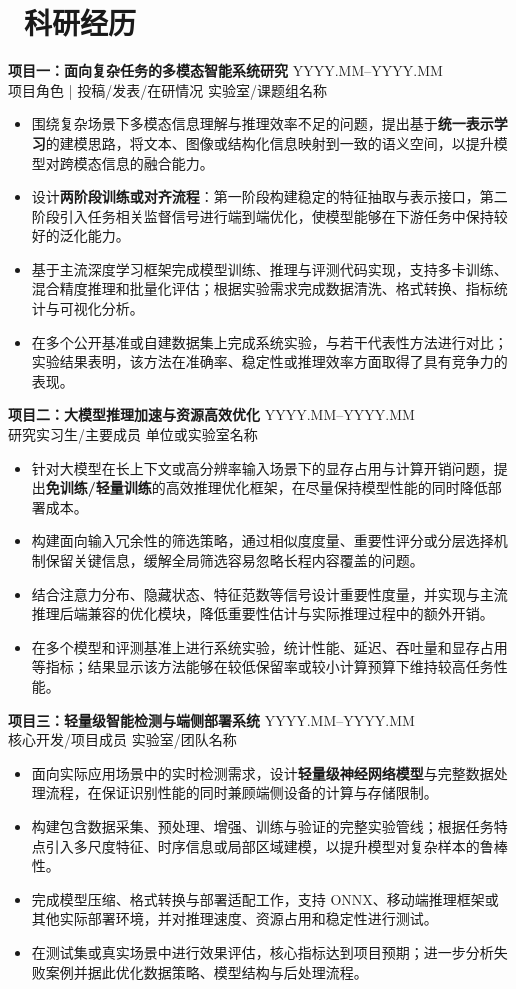 \documentclass[10pt,a4paper]{ctexart}
\newcommand{\resumeItem}[1]{\item #1}
\newcommand{\projectHeader}[4]{%
  \noindent\textcolor{iconblue}{\textbf{#1}} \hfill \textcolor{iconblue}{\small #2}\\[-0.2ex]
  {\small \textcolor{textgray}{#3 \hfill #4}}\vspace{0.2ex}
}
\begin{document}
\section*{\faCode\ 科研经历}
\projectHeader{项目一：面向复杂任务的多模态智能系统研究}{YYYY.MM--YYYY.MM}{项目角色 | 投稿/发表/在研情况}{实验室/课题组名称}
\begin{itemize}
    \resumeItem{围绕复杂场景下多模态信息理解与推理效率不足的问题，提出基于\textbf{统一表示学习}的建模思路，将文本、图像或结构化信息映射到一致的语义空间，以提升模型对跨模态信息的融合能力。}
    \resumeItem{设计\textbf{两阶段训练或对齐流程}：第一阶段构建稳定的特征抽取与表示接口，第二阶段引入任务相关监督信号进行端到端优化，使模型能够在下游任务中保持较好的泛化能力。}
    \resumeItem{基于主流深度学习框架完成模型训练、推理与评测代码实现，支持多卡训练、混合精度推理和批量化评估；根据实验需求完成数据清洗、格式转换、指标统计与可视化分析。}
    \resumeItem{在多个公开基准或自建数据集上完成系统实验，与若干代表性方法进行对比；实验结果表明，该方法在准确率、稳定性或推理效率方面取得了具有竞争力的表现。}
\end{itemize}

\vspace{0.5ex}
\projectHeader{项目二：大模型推理加速与资源高效优化}{YYYY.MM--YYYY.MM}{研究实习生/主要成员}{单位或实验室名称}
\begin{itemize}
    \resumeItem{针对大模型在长上下文或高分辨率输入场景下的显存占用与计算开销问题，提出\textbf{免训练/轻量训练}的高效推理优化框架，在尽量保持模型性能的同时降低部署成本。}
    \resumeItem{构建面向输入冗余性的筛选策略，通过相似度度量、重要性评分或分层选择机制保留关键信息，缓解全局筛选容易忽略长程内容覆盖的问题。}
    \resumeItem{结合注意力分布、隐藏状态、特征范数等信号设计重要性度量，并实现与主流推理后端兼容的优化模块，降低重要性估计与实际推理过程中的额外开销。}
    \resumeItem{在多个模型和评测基准上进行系统实验，统计性能、延迟、吞吐量和显存占用等指标；结果显示该方法能够在较低保留率或较小计算预算下维持较高任务性能。}
\end{itemize}

\vspace{0.5ex}
\projectHeader{项目三：轻量级智能检测与端侧部署系统}{YYYY.MM--YYYY.MM}{核心开发/项目成员}{实验室/团队名称}
\begin{itemize}
    \resumeItem{面向实际应用场景中的实时检测需求，设计\textbf{轻量级神经网络模型}与完整数据处理流程，在保证识别性能的同时兼顾端侧设备的计算与存储限制。}
    \resumeItem{构建包含数据采集、预处理、增强、训练与验证的完整实验管线；根据任务特点引入多尺度特征、时序信息或局部区域建模，以提升模型对复杂样本的鲁棒性。}
    \resumeItem{完成模型压缩、格式转换与部署适配工作，支持 ONNX、移动端推理框架或其他实际部署环境，并对推理速度、资源占用和稳定性进行测试。}
    \resumeItem{在测试集或真实场景中进行效果评估，核心指标达到项目预期；进一步分析失败案例并据此优化数据策略、模型结构与后处理流程。}
\end{itemize}
\end{document}
